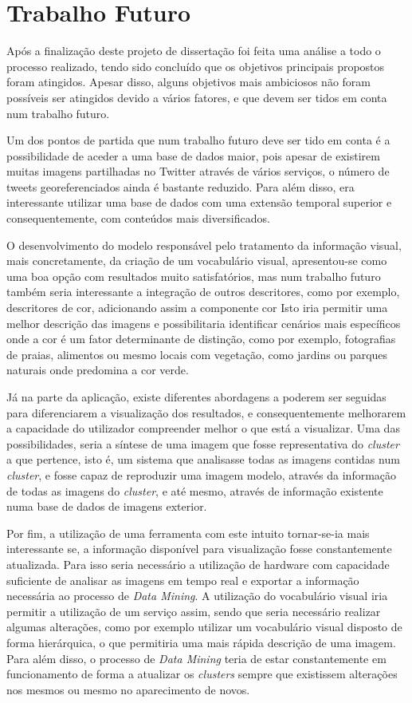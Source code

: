 \section{Trabalho Futuro}

Após a finalização deste projeto de dissertação foi feita uma análise a todo o processo realizado, tendo sido concluído que os objetivos principais propostos foram atingidos. Apesar disso, alguns objetivos mais ambiciosos não foram possíveis ser atingidos devido a vários fatores, e que devem ser tidos em conta num trabalho futuro.

Um dos pontos de partida que num trabalho futuro deve ser tido em conta é a possibilidade de aceder a uma base de dados maior, pois apesar de existirem muitas imagens partilhadas no Twitter através de vários serviços, o número de tweets georeferenciados ainda é bastante reduzido. Para além disso, era interessante utilizar uma base de dados com uma extensão temporal superior e consequentemente, com conteúdos mais diversificados.

O desenvolvimento do modelo responsável pelo tratamento da informação visual, mais concretamente, da criação de um vocabulário visual, apresentou-se como uma boa opção com resultados muito satisfatórios, mas num trabalho futuro também seria interessante a integração de outros descritores, como por exemplo, descritores de cor, adicionando assim a componente cor Isto iria permitir uma melhor descrição das imagens e possibilitaria identificar cenários mais específicos onde a cor é um fator determinante de distinção, como por exemplo, fotografias de praias, alimentos ou mesmo locais com vegetação, como jardins ou parques naturais onde predomina a cor verde. 

Já na parte da aplicação, existe diferentes abordagens a poderem ser seguidas para diferenciarem a visualização dos resultados, e consequentemente melhorarem a capacidade do utilizador compreender melhor o que está a visualizar. Uma das possibilidades, seria a síntese de uma imagem que fosse representativa do \textit{cluster} a que pertence, isto é, um sistema que analisasse todas as imagens contidas num \textit{cluster}, e fosse capaz de reproduzir uma imagem modelo, através da informação de todas as imagens do \textit{cluster}, e até mesmo, através de informação existente numa base de dados de imagens exterior.

Por fim, a utilização de uma ferramenta com este intuito tornar-se-ia mais interessante se, a informação disponível para visualização fosse constantemente atualizada. Para isso seria necessário a utilização de hardware com capacidade suficiente de analisar as imagens em tempo real e exportar a informação necessária ao processo de \textit{Data Mining}. A utilização do vocabulário visual iria permitir a utilização de um serviço assim, sendo que seria necessário realizar algumas alterações, como por exemplo utilizar um vocabulário visual disposto de forma hierárquica, o que permitiria uma mais rápida descrição de uma imagem. Para além disso, o processo de \textit{Data Mining} teria de estar constantemente em funcionamento de forma a atualizar os \textit{clusters} sempre que existissem alterações nos mesmos ou mesmo no aparecimento de novos.


